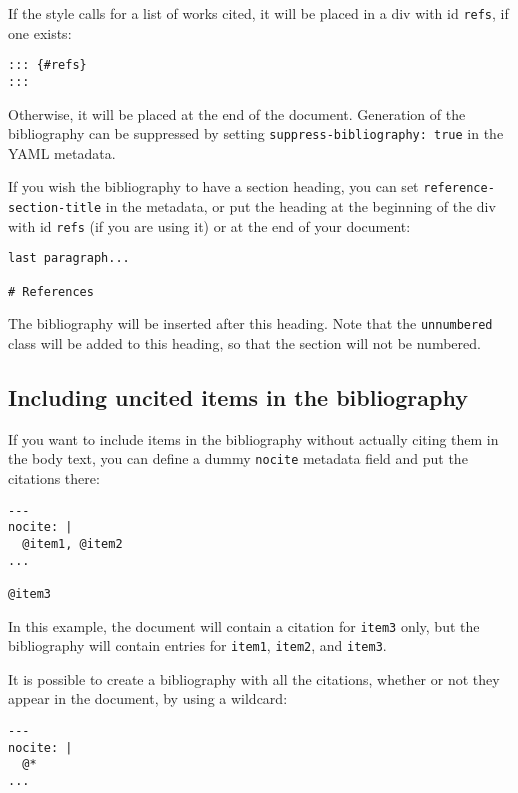 \documentclass[]{article}
\begin{document}
If the style calls for a list of works cited, it will be placed in a div
with id \texttt{refs}, if one exists:

\begin{verbatim}
::: {#refs}
:::
\end{verbatim}

Otherwise, it will be placed at the end of the document. Generation of
the bibliography can be suppressed by setting
\texttt{suppress-bibliography:\ true} in the YAML metadata.

If you wish the bibliography to have a section heading, you can set
\texttt{reference-section-title} in the metadata, or put the heading at
the beginning of the div with id \texttt{refs} (if you are using it) or
at the end of your document:

\begin{verbatim}
last paragraph...

# References
\end{verbatim}

The bibliography will be inserted after this heading. Note that the
\texttt{unnumbered} class will be added to this heading, so that the
section will not be numbered.

\hypertarget{including-uncited-items-in-the-bibliography}{%
\subsection{Including uncited items in the
bibliography}\label{including-uncited-items-in-the-bibliography}}

If you want to include items in the bibliography without actually citing
them in the body text, you can define a dummy \texttt{nocite} metadata
field and put the citations there:

\begin{verbatim}
---
nocite: |
  @item1, @item2
...

@item3
\end{verbatim}

In this example, the document will contain a citation for \texttt{item3}
only, but the bibliography will contain entries for \texttt{item1},
\texttt{item2}, and \texttt{item3}.

It is possible to create a bibliography with all the citations, whether
or not they appear in the document, by using a wildcard:

\begin{verbatim}
---
nocite: |
  @*
...
\end{verbatim}
\end{document}
